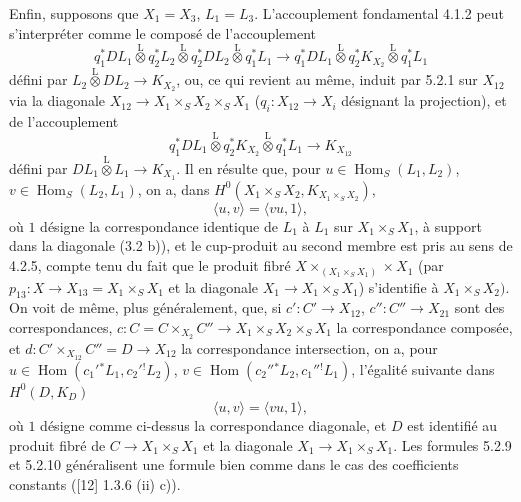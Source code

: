 \documentclass[11pt]{article}
\DeclareMathOperator{\Hom}{Hom}
\providecommand{\Hom}{\operatorname{Hom}}
\providecommand{\Hom}{\operatorname{Hom}}
\begin{document}
Enfin, supposons que $X_1=X_3$, $L_1=L_3$. L'accouplement fondamental 4.1.2 peut s'interpréter comme le composé de l'accouplement
\begin{equation}
\tag{5.2.7}
q_1^*DL_1\overset{\mathrm{L}}{\otimes}q_2^*L_2\overset{\mathrm{L}}{\otimes}q_2^*DL_2\overset{\mathrm{L}}{\otimes}q_1^*L_1
\longrightarrow
q_1^*DL_1\overset{\mathrm{L}}{\otimes}q_2^*K_{X_2}\overset{\mathrm{L}}{\otimes}q_1^*L_1
\end{equation}
défini par $L_2\overset{\mathrm{L}}{\otimes}DL_2\to K_{X_2}$, ou, ce qui revient au même, induit par 5.2.1 sur $X_{12}$ via la diagonale $X_{12}\to X_1\times_SX_2\times_SX_1$ ($q_i:X_{12}\to X_i$ désignant la projection), et de l'accouplement
\begin{equation}
\tag{5.2.8}
q_1^*DL_1\overset{\mathrm{L}}{\otimes}q_2^*K_{X_2}\overset{\mathrm{L}}{\otimes}q_1^*L_1\longrightarrow K_{X_{12}}
\end{equation}
défini par $DL_1\overset{\mathrm{L}}{\otimes}L_1\to K_{X_1}$. Il en résulte que, pour $u\in\Hom_S(L_1,L_2)$, $v\in\Hom_S(L_2,L_1)$, on a, dans $H^0(X_1\times_SX_2,K_{X_1\times_SX_2})$,
\begin{equation}
\tag{5.2.9}
\langle u,v\rangle=\langle vu,1\rangle,
\end{equation}
où $1$ désigne la correspondance identique de $L_1$ à $L_1$ sur $X_1\times_SX_1$, à support dans la diagonale (3.2 b)), et le cup-produit au second membre est pris au sens de 4.2.5, compte tenu du fait que le produit fibré $X\times_{(X_1\times_SX_1)}\times X_1$ (par $p_{13}:X\to X_{13}=X_1\times_SX_1$ et la diagonale $X_1\to X_1\times_SX_1$) s'identifie à $X_1\times_SX_2)$. On voit de même, plus généralement, que, si $c':C'\to X_{12}$, $c'':C''\to X_{21}$
sont des correspondances, $c:C=C\times_{X_2}C''\to X_1\times_SX_2\times_SX_1$ la 
correspondance composée, et $d:C'\times_{X_{12}}C''=D\to X_{12}$ la correspondance intersection, on a, pour $u\in\Hom(c_1'{}^*L_1,c_2'{}^!L_2)$, $v\in\Hom(c_2''{}^*L_2,c_1''{}^!L_1)$, l'égalité suivante dans $H^0(D,K_D)$
\begin{equation}
\tag{5.2.10}
\langle u,v\rangle=\langle vu,1\rangle,
\end{equation}
où $1$ désigne comme ci-dessus la correspondance diagonale, et $D$ est identifié au produit fibré de $C\to X_1\times_SX_1$ et la diagonale $X_1\to X_1\times_SX_1$. Les formules 5.2.9 et 5.2.10 généralisent une formule bien comme dans le cas des coefficients constants ([12] 1.3.6 (ii) c)).
\end{document}
